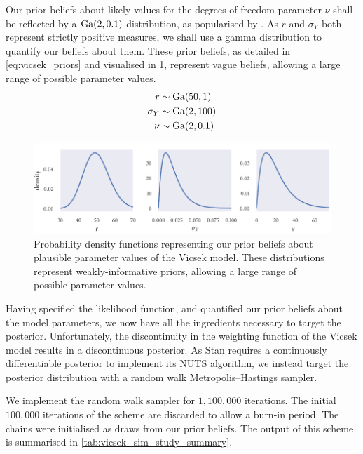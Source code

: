 Our prior beliefs about likely values for the degrees of freedom parameter $\nu$ shall be
reflected by a $\textrm{Ga}(2, 0.1)$ distribution, as popularised by \textcite{juarez10}.  As $r$
and $\sigma_Y$ both represent strictly positive measures, we shall use a gamma
distribution to quantify our beliefs about them. These prior beliefs, as detailed in
\cref{eq:vicsek_priors} and visualised in \cref{fig:vicsek_priors}, represent vague
beliefs, allowing a large range of possible parameter values.
\begin{align}
    \label{eq:vicsek_priors}
    \begin{split}
        r           & \sim \textrm{Ga}(50, 1) \\
        \sigma_Y    & \sim \textrm{Ga}(2, 100)\\
        \nu         & \sim \textrm{Ga}(2, 0.1)
    \end{split}
\end{align}
\begin{figure}[tb]
    \includegraphics{priors.pdf}
    \caption{Probability density functions representing our prior beliefs about plausible
    parameter values of the Vicsek model. These distributions represent
    weakly-informative priors, allowing a large range of possible parameter values.}
    \label{fig:vicsek_priors}
\end{figure}

Having specified the likelihood function, and quantified our prior beliefs about the model
parameters, we now have all the ingredients necessary to target the posterior.
Unfortunately, the discontinuity in the weighting function of the Vicsek model results in
a discontinuous posterior. As Stan requires a continuously differentiable posterior to
implement its NUTS algorithm, we instead target the posterior distribution with a random
walk Metropolis--Hastings sampler.

We implement the random walk sampler for $1,100,000$ iterations. The initial $100,000$
iterations of the scheme are discarded to allow a burn-in period. The chains were
initialised as draws from our prior beliefs. The output of this scheme is summarised in
\cref{tab:vicsek_sim_study_summary}.

